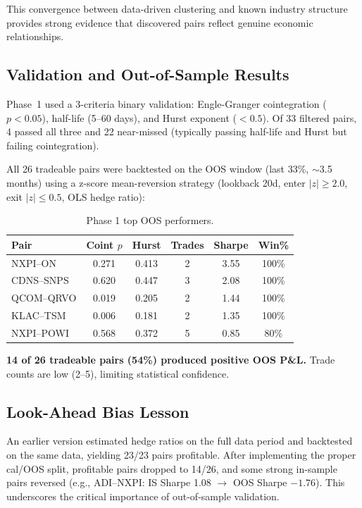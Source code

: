 \documentclass[11pt, a4paper]{article}
\begin{document}
This convergence between data-driven clustering and known industry structure provides strong evidence that discovered pairs reflect genuine economic relationships.

\subsection{Validation and Out-of-Sample Results}

Phase~1 used a 3-criteria binary validation: Engle-Granger cointegration \cite{engle1987} ($p < 0.05$), half-life \cite{chan2013} (5--60 days), and Hurst exponent \cite{hurst1951} ($< 0.5$). Of 33 filtered pairs, 4 passed all three and 22 near-missed (typically passing half-life and Hurst but failing cointegration).

All 26 tradeable pairs were backtested on the OOS window (last 33\%, $\sim$3.5 months) using a z-score mean-reversion strategy (lookback 20d, enter $|z| \geq 2.0$, exit $|z| \leq 0.5$, OLS hedge ratio):

\begin{table}[H]
\centering
\caption{Phase 1 top OOS performers.}
\small
\begin{tabular}{@{}lccccc@{}}
\toprule
\textbf{Pair} & \textbf{Coint $p$} & \textbf{Hurst} & \textbf{Trades} & \textbf{Sharpe} & \textbf{Win\%} \\
\midrule
NXPI--ON     & 0.271 & 0.413 & 2 & 3.55 & 100\% \\
CDNS--SNPS   & 0.620 & 0.447 & 3 & 2.08 & 100\% \\
QCOM--QRVO   & 0.019 & 0.205 & 2 & 1.44 & 100\% \\
KLAC--TSM    & 0.006 & 0.181 & 2 & 1.35 & 100\% \\
NXPI--POWI   & 0.568 & 0.372 & 5 & 0.85 & 80\% \\
\bottomrule
\end{tabular}
\label{tab:phase1-oos}
\end{table}

\textbf{14 of 26 tradeable pairs (54\%) produced positive OOS P\&L.} Trade counts are low (2--5), limiting statistical confidence.

\subsection{Look-Ahead Bias Lesson}

An earlier version estimated hedge ratios on the full data period and backtested on the same data, yielding 23/23 pairs profitable. After implementing the proper cal/OOS split, profitable pairs dropped to 14/26, and some strong in-sample pairs reversed (e.g., ADI--NXPI: IS Sharpe 1.08 $\to$ OOS Sharpe $-1.76$). This underscores the critical importance of out-of-sample validation.
\end{document}
